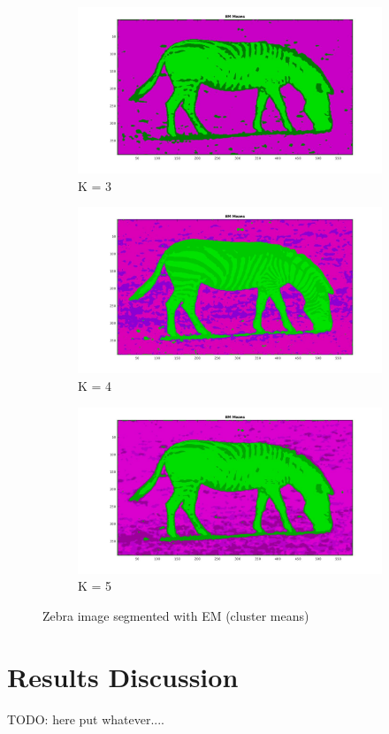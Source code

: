 \documentclass[paper=a4, fontsize=11pt]{scrartcl} %
\numberwithin{equation}{section} %
\numberwithin{figure}{section} %
\numberwithin{table}{section} %
\begin{document}
\begin{figure}
\centering
\begin{subfigure}{.3\textwidth}
  \centering
  \includegraphics[width=\linewidth]{zebra/em3_means.jpg}
  \caption{K = 3}
\end{subfigure}
\begin{subfigure}{.3\textwidth}
  \centering
  \includegraphics[width=\linewidth]{zebra/em4_means.jpg}
  \caption{K = 4}
\end{subfigure}
\begin{subfigure}{.3\textwidth}
  \centering
  \includegraphics[width=\linewidth]{zebra/em5_means.jpg}
  \caption{K = 5}
\end{subfigure}
\caption{Zebra image segmented with EM (cluster means)}
\label{fig:em_zebra}
\end{figure}


\section{Results Discussion}

TODO: here put whatever....
\end{document}
